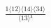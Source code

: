 \documentclass[varwidth, border=5pt]{standalone}
\begin{document}
\begin{my}
$\begin{gathered}
\scriptscriptstyle\frac{1⟨12⟩⟨14⟩⟨34⟩}{⟨13⟩³}
\end{gathered}$
\end{my}
\end{document}
